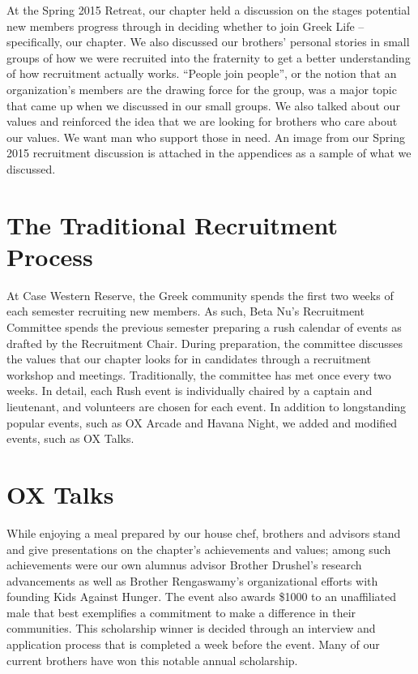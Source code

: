     At the Spring 2015 Retreat, our chapter held a discussion on the stages potential new members progress through in deciding whether to join Greek Life – specifically, our chapter. We also discussed our brothers' personal stories in small groups of how we were recruited into the fraternity to get a better understanding of how recruitment actually works. ``People join people'', or the notion that an organization's members are the drawing force for the group, was a major topic that came up when we discussed in our small groups. We also talked about our values and reinforced the idea that we are looking for brothers who care about our values. We want man who support those in need. An image from our Spring 2015 recruitment discussion is attached in the appendices as a sample of what we discussed. 
    
  \section*{The Traditional Recruitment Process}
    At Case Western Reserve, the Greek community spends the first two weeks of each semester recruiting new members. As such, Beta Nu's Recruitment Committee spends the previous semester preparing a rush calendar of events as drafted by the Recruitment Chair. During preparation, the committee discusses the values that our chapter looks for in candidates through a recruitment workshop and meetings. Traditionally, the committee has met once every two weeks. In detail, each Rush event is individually chaired by a captain and lieutenant, and volunteers are chosen for each event. In addition to longstanding popular events, such as OX Arcade and Havana Night, we added and modified events, such as OX Talks.
    
  \section*{OX Talks}
    While enjoying a meal prepared by our house chef, brothers and advisors stand and give presentations on the chapter’s achievements and values; among such achievements were our own alumnus advisor Brother Drushel’s research advancements as well as Brother Rengaswamy’s organizational efforts with founding Kids Against Hunger. The event also awards \$1000 to an unaffiliated male that best exemplifies a commitment to make a difference in their communities. This scholarship winner is decided through an interview and application process that is completed a week before the event. Many of our current brothers have won this notable annual scholarship. 
    
